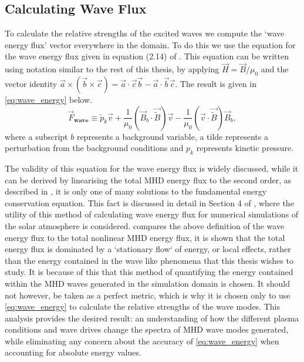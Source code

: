 \subsection{Calculating Wave Flux}\label{sec:waveflux}

To calculate the relative strengths of the excited waves we compute the `wave energy flux' vector everywhere in the domain.
To do this we use the equation for the wave energy flux given in equation (2.14) of \cite{leroy1985}.
This equation can be written using notation similar to the rest of this thesis, by applying $\vec{H} = \vec{B}/\mu_0$ and the vector identity $\vec{a} \times (\vec{b} \times \vec{c}) = \vec{a} \cdot \vec{c}\vec{b} - \vec{a} \cdot \vec{b}\vec{c}$.
The result is given in \cref{eq:wave_energy} below.
\begin{equation}
\vec{F}_{\textbf{wave}} \equiv \widetilde{p}_k \vec{v} + \frac{1}{\mu_0} \left(\vec{B}_b \cdot \vec{\widetilde{B}}\right) \vec{v} - \frac{1}{\mu_0}\left(\vec{v} \cdot \vec{\widetilde{B}} \right) \vec{B}_b,
\label{eq:wave_energy}
\end{equation}
where a subscript $b$ represents a background variable, a tilde represents a perturbation from the background conditions and $p_k$ represents kinetic pressure.

The validity of this equation for the wave energy flux is widely discussed, %
while it can be derived by linearising the total MHD energy flux to the second order, as described in \cite{leroy1985}, it is only one of many solutions to the fundamental energy conservation equation.
This fact is discussed in detail in Section 4 of \cite{bogdan2003}, where the utility of this method of calculating wave energy flux for numerical simulations of the solar atmosphere is considered.
\cite{bogdan2003} compares the above definition of the wave energy flux to the total nonlinear MHD energy flux, it is shown that the total energy flux is dominated by a `stationary flow` of energy, or local effects, rather than the energy contained in the wave like phenomena that this thesis wishes to study.
It is because of this that this method of quantifying the energy contained within the MHD waves generated in the simulation domain is chosen.
It should not however, be taken as a perfect metric, which is why it is chosen only to use \cref{eq:wave_energy} to calculate the relative strengths of the wave modes.
This analysis provides the desired result: an understanding of how the different plasma conditions and wave drives change the spectra of MHD wave modes generated, while eliminating any concern about the accuracy of \cref{eq:wave_energy} when accounting for absolute energy values.



